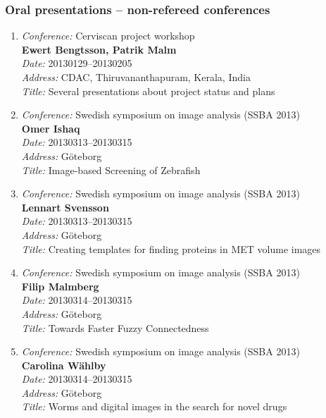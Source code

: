 \subsubsection{Oral presentations -- non-refereed conferences}
\begin{enumerate}
\item
{\em Conference:} Cerviscan project workshop~\\
{\bf Ewert Bengtsson, Patrik Malm}~\\
{\em Date:} 20130129--20130205~\\
{\em Address:} CDAC, Thiruvananthapuram, Kerala, India~\\
{\em Title:} Several presentations about project status and plans

\item 
{\em Conference:} Swedish symposium on image analysis (SSBA 2013)~\\
{\bf Omer Ishaq}~\\
{\em Date:} 20130313--20130315~\\
{\em Address:} G\"{o}teborg~\\
{\em Title:} Image-based Screening of Zebrafish

\item 
{\em Conference:} Swedish symposium on image analysis (SSBA 2013)~\\
{\bf Lennart Svensson}~\\
{\em Date:} 20130313--20130315~\\
{\em Address:} G\"{o}teborg~\\
{\em Title:} Creating templates for finding proteins in MET volume images


\item 
{\em Conference:} Swedish symposium on image analysis (SSBA 2013)~\\
{\bf Filip Malmberg}~\\
{\em Date:} 20130314--20130315~\\
{\em Address:} G\"{o}teborg~\\
{\em Title:} Towards Faster Fuzzy Connectedness

\item 
{\em Conference:} Swedish symposium on image analysis (SSBA 2013)~\\
{\bf Carolina W\"{a}hlby}~\\
{\em Date:} 20130314--20130315~\\
{\em Address:} G\"{o}teborg~\\
{\em Title:} Worms and digital images in the search for novel drugs


\end{enumerate}
